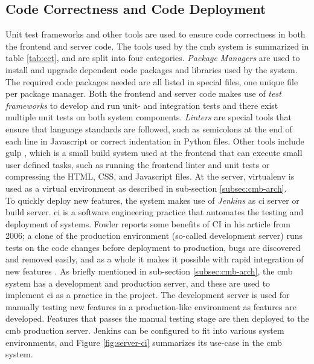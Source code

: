 \subsection{Code Correctness and Code Deployment}
Unit test frameworks and other tools are used to ensure code correctness in both the frontend and server code. The tools used by the \gls{cmb} system is summarized in table \ref{tab:cct}, and are split into four categories. \textit{Package Managers} are used to install and upgrade dependent code packages and libraries used by the system. The required code packages needed are all listed in special files, one unique file per package manager. Both the frontend and server code makes use of \textit{test frameworks} to develop and run unit- and integration tests and there exist multiple unit tests on both system components. \textit{Linters} are special tools that ensure that language standards are followed, such as semicolons at the end of each line in Javascript or correct indentation in Python files. Other tools include gulp \cite{GULP}, which is a small build system used at the frontend that can execute small user defined tasks, such as running the frontend linter and unit tests or compressing the HTML, CSS, and Javascript files. At the server, virtualenv \cite{VIRTUALENV} is used as a virtual environment as described in sub-section \ref{subsec:cmb-arch}. \\

To quickly deploy new features, the system makes use of \textit{Jenkins} \cite{JENKINS} as \gls{ci} server or build server. \gls{ci} is a software engineering practice that automates the testing and deployment of systems. Fowler reports some benefits of CI in his article from 2006; a clone of the production environment (so-called development server) runs tests on the code changes before deployment to production, bugs are discovered and removed easily, and as a whole it makes it possible with rapid integration of new features \cite{a:F:CI}. As briefly mentioned in sub-section \ref{subsec:cmb-arch}, the \gls{cmb} system has a development and production server, and these are used to implement \gls{ci} as a practice in the project. The development server is used for manually testing new features in a production-like environment as features are developed. Features that passes the manual testing stage are then deployed to the \gls{cmb} production server. Jenkins can be configured to fit into various system environments, and Figure \ref{fig:server-ci} summarizes its use-case in the \gls{cmb} system. \\

